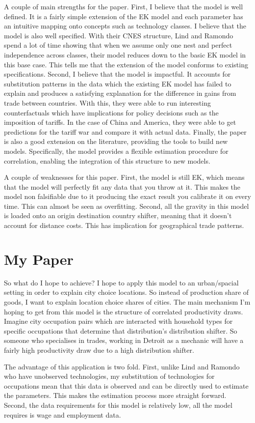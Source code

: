 \documentclass[10pt]{article}
\begin{document}
A couple of main strengths for the paper. First, I believe that the model is well defined. It is a fairly simple extension of the EK model and each parameter has an intuitive mapping onto concepts such as technology classes. I believe that the model is also well specified. With their CNES structure, Lind and Ramondo spend a lot of time showing that when we assume only one nest and perfect independence across classes, their model reduces down to the basic EK model in this base case. This tells me that the extension of the model conforms to existing specifications. Second, I believe that the model is impactful. It accounts for substitution patterns in the data which the existing EK model has failed to explain and produces a satisfying explanation for the difference in gains from trade between countries. With this, they were able to run interesting counterfactuals which have implications for policy decisions such as the imposition of tariffs. In the case of China and America, they were able to get predictions for the tariff war and compare it with actual data. Finally, the paper is also a good extension on the literature, providing the tools to build new models. Specifically, the model provides a flexible estimation procedure for correlation, enabling the integration of this structure to new models.

A couple of weaknesses for this paper. First, the model is still EK, which means that the model will perfectly fit any data that you throw at it. This makes the model non falsifiable due to it producing the exact result you calibrate it on every time. This can almost be seen as overfitting. Second, all the gravity in this model is loaded onto an origin destination country shifter, meaning that it doesn’t account for distance costs. This has implication for geographical trade patterns.

\section{My Paper}

So what do I hope to achieve? I hope to apply this model to an urban/spacial setting in order to explain city choice locations. So instead of production share of goods, I want to explain location choice shares of cities. The main mechanism I’m hoping to get from this model is the structure of correlated productivity draws. Imagine city occupation pairs which are interacted with household types for specific occupations that determine that distribution’s distribution shifter. So someone who specialises in trades, working in Detroit as a mechanic will have a fairly high productivity draw due to a high distribution shifter.

The advantage of this application is two fold. First, unlike Lind and Ramondo who have unobserved technologies, my substitution of technologies for occupations mean that this data is observed and can be directly used to estimate the parameters. This makes the estimation process more straight forward. Second, the data requirements for this model is relatively low, all the model requires is wage and employment data.
\end{document}
